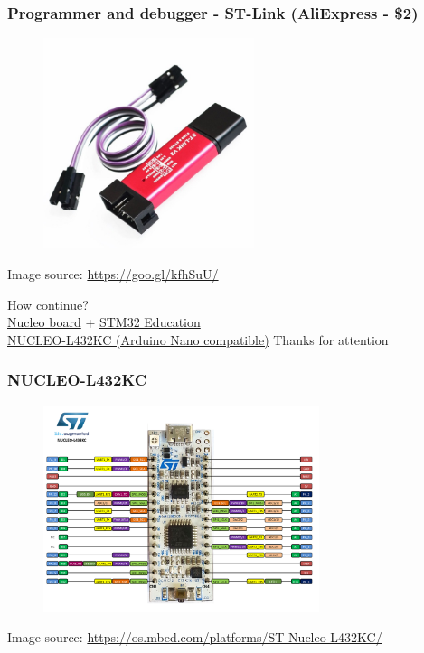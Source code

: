 \documentclass[12;pt,t]{beamer} %
\newcommand{\srctext}[1]{{\fontsize{7}{9}\selectfont\textcolor{sourcesclr}{#1}}}
\begin{document}
\begin{frame}
\frametitle{Programmer and debugger - ST-Link (AliExpress - \$2)}
	\begin{figure}[H]
		\includegraphics[width=0.55\textwidth]{img/Honeyview_ST-Link-V2.jpg}
	\end{figure}
	\srctext{Image source: \url{https://goo.gl/kfhSuU/}}
\end{frame}


\begin{frame}[fragile]
	\begin{center}
	\vfill
		How continue? \\
		
		\href{http://www.st.com/en/evaluation-tools/stm32-mcu-nucleo.html?querycriteria=productId=LN1847}{Nucleo board} + \href{http://www.st.com/content/st_com/en/support/learning/stm32-education.html}{STM32 Education} 
		\\
		
		{\tiny 
		\href{http://www.st.com/content/st_com/en/products/evaluation-tools/product-evaluation-tools/mcu-eval-tools/stm32-mcu-eval-tools/stm32-mcu-nucleo/nucleo-l432kc.html}{NUCLEO-L432KC (Arduino Nano compatible)}
	}
	\vfill
	    {\huge Thanks for attention}
	\end{center}
	\vfill
\end{frame}

\begin{frame}
\frametitle{NUCLEO-L432KC}
	
	\begin{figure}[H]
		\includegraphics[width=0.72\textwidth]{img/nucleo_l432kc_2017_10_09.png}
	\end{figure}
	
	\srctext{Image source: \url{https://os.mbed.com/platforms/ST-Nucleo-L432KC/}}
\end{frame}
\end{document}
